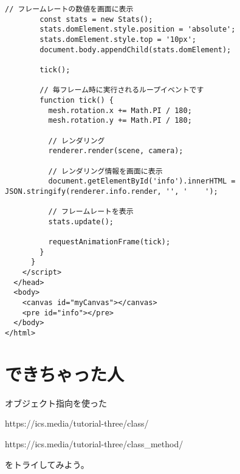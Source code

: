 \documentclass[mingoth,11pt,a4j,uplatex]{jsarticle}
\begin{document}
\begin{lstlisting}[caption=05-32.html]
        // フレームレートの数値を画面に表示
        const stats = new Stats();
        stats.domElement.style.position = 'absolute';
        stats.domElement.style.top = '10px';
        document.body.appendChild(stats.domElement);

        tick();

        // 毎フレーム時に実行されるループイベントです
        function tick() {
          mesh.rotation.x += Math.PI / 180;
          mesh.rotation.y += Math.PI / 180;

          // レンダリング
          renderer.render(scene, camera);

          // レンダリング情報を画面に表示
          document.getElementById('info').innerHTML = JSON.stringify(renderer.info.render, '', '    ');

          // フレームレートを表示
          stats.update();

          requestAnimationFrame(tick);
        }
      }
    </script>
  </head>
  <body>
    <canvas id="myCanvas"></canvas>
    <pre id="info"></pre>
  </body>
</html>
\end{lstlisting}

\section{できちゃった人}
オブジェクト指向を使った

https://ics.media/tutorial-three/class/

https://ics.media/tutorial-three/class\_method/

をトライしてみよう。


\end{document}

